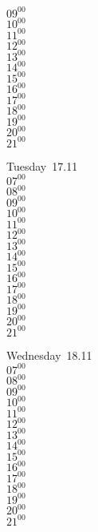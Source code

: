 \documentclass[11pt,a4paper]{book}\usepackage[]{graphicx}\usepackage[]{color}
\begin{document}
{{{{{{{{{{{{{{{{{{{\begin{tcolorbox}
{$09^{00}$\\
$10^{00}$\\
$11^{00}$\\
$12^{00}$\\
$13^{00}$\\
$14^{00}$\\
$15^{00}$\\
$16^{00}$\\
$17^{00}$\\
$18^{00}$\\
$19^{00}$\\
$20^{00}$\\
$21^{00}$}\\
\end{tcolorbox}
%
\begin{tcolorbox}
Tuesday~17.11\\
{ 
$07^{00}$\\
$08^{00}$\\
$09^{00}$\\
$10^{00}$\\
$11^{00}$\\
$12^{00}$\\
$13^{00}$\\
$14^{00}$\\
$15^{00}$\\
$16^{00}$\\
$17^{00}$\\
$18^{00}$\\
$19^{00}$\\
$20^{00}$\\
$21^{00}$}\\
\end{tcolorbox}
%
\begin{tcolorbox}
Wednesday~18.11\\
{ 
$07^{00}$\\
$08^{00}$\\
$09^{00}$\\
$10^{00}$\\
$11^{00}$\\
$12^{00}$\\
$13^{00}$\\
$14^{00}$\\
$15^{00}$\\
$16^{00}$\\
$17^{00}$\\
$18^{00}$\\
$19^{00}$\\
$20^{00}$\\
$21^{00}$}\\

\end{tcolorbox}}}}}}}}}}}}}}}}}}}}
\end{document}
